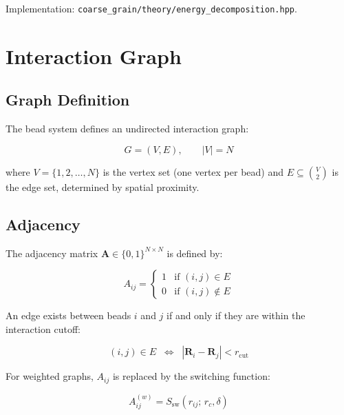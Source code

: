 \documentclass[11pt, a4paper, oneside]{article}
\newcommand{\file}[1]{\texttt{#1}}
\begin{document}
Implementation: \file{coarse\_grain/theory/energy\_decomposition.hpp}.


\section{Interaction Graph}
\label{sec:graph}

\subsection{Graph Definition}

The bead system defines an undirected interaction graph:

\begin{equation}
\boxed{G = (V, E), \qquad |V| = N}
\label{eq:graph}
\end{equation}

where $V = \{1, 2, \ldots, N\}$ is the vertex set (one vertex per bead)
and $E \subseteq \binom{V}{2}$ is the edge set, determined by spatial
proximity.

\subsection{Adjacency}

The adjacency matrix $\mathbf{A} \in \{0, 1\}^{N \times N}$ is defined by:

\begin{equation}
A_{ij} = \begin{cases}
  1 & \text{if } (i, j) \in E \\[3pt]
  0 & \text{if } (i, j) \notin E
\end{cases}
\label{eq:adjacency}
\end{equation}

An edge exists between beads $i$ and $j$ if and only if they are within
the interaction cutoff:

\begin{equation}
(i, j) \in E \;\;\Longleftrightarrow\;\;
  |\mathbf{R}_i - \mathbf{R}_j| < r_{\mathrm{cut}}
\label{eq:edge_criterion}
\end{equation}

For weighted graphs, $A_{ij}$ is replaced by the switching function:

\begin{equation}
A_{ij}^{(w)} = S_{\mathrm{sw}}(r_{ij};\, r_c, \delta)
\label{eq:weighted_adj}
\end{equation}
\end{document}
